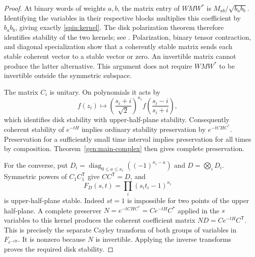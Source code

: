 \documentclass[reqno]{amsart}
\theoremstyle{definition}
\theoremstyle{remark}
\DeclareMathOperator{\diag}{diag}
\begin{document}
\begin{proof}
At binary words of weights $a,b$, the matrix entry of $WMW^*$ is
$M_{ab}/\sqrt{b_ab_b}$.  Identifying the variables in their respective
blocks multiplies this coefficient by $b_ab_b$, giving exactly
\eqref{spin:kernel}.  The disk polarization theorem therefore identifies
stability of the two kernels; see \cite[Theorem~2.1]{BB10II}.
Polarization, binary tensor contraction, and diagonal specialization show
that a coherently stable matrix sends each stable coherent vector to a
stable vector or zero.  An invertible matrix cannot produce the latter
alternative.  This argument does not require $WMW^*$ to be invertible
outside the symmetric subspace.

The matrix $C_i$ is unitary.  On polynomials it acts by
\begin{equation}\label{spin:cayley-action}
 f(z_i)\longmapsto
 \left(\frac{s_i+i}{\sqrt2}\right)^{\kappa_i}
 f\left(\frac{s_i-i}{s_i+i}\right),
\end{equation}
which identifies disk stability with upper-half-plane stability.
Consequently coherent stability of $e^{-tH}$ implies ordinary stability
preservation by $e^{-tCHC^*}$.  Preservation for a sufficiently small
time interval implies preservation for all times by composition.
Theorem~\ref{gen:main-complex} then gives complete preservation.

For the converse, put
$D_i=\diag_{0\leq a\leq\kappa_i}((-1)^{\kappa_i-a})$ and
$D=\bigotimes_iD_i$.  Symmetric powers of $C_1C_1^{\mathsf T}$ give
$CC^{\mathsf T}=D$, and
\begin{equation}\label{spin:universal-halfplane}
 F_D(s,t)=\prod_i(s_it_i-1)^{\kappa_i}
\end{equation}
is upper-half-plane stable.  Indeed $st=1$ is impossible for two points
of the upper half-plane.  A complete preserver
$N=e^{-tCHC^*}=Ce^{-tH}C^*$ applied in the $s$ variables to this kernel
produces the coherent coefficient matrix
$ND=Ce^{-tH}C^{\mathsf T}$.  This is precisely the separate Cayley
transform of both groups of variables in $F_{e^{-tH}}$.  It is nonzero
because $N$ is invertible.  Applying the inverse transforms proves the
required disk stability.
\end{proof}
\end{document}
